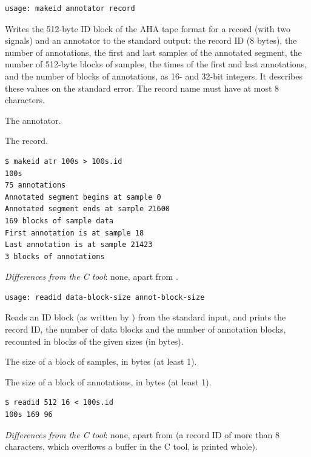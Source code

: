 \begin{lstlisting}[style=signature,language={}]
usage: makeid annotator record
\end{lstlisting}
Writes the 512-byte ID block of the AHA tape format for a record (with two signals) and an
annotator to the standard output: the record ID (8 bytes), the number of annotations, the
first and last samples of the annotated segment, the number of 512-byte blocks of samples,
the times of the first and last annotations, and the number of blocks of annotations, as
16- and 32-bit integers. It describes these values on the standard error. The record name
must have at most 8 characters.
\begin{params}
\item[annotator] The annotator.
\item[record] The record.
\end{params}
\begin{lstlisting}[style=text]
$ makeid atr 100s > 100s.id
100s
75 annotations
Annotated segment begins at sample 0
Annotated segment ends at sample 21600
169 blocks of sample data
First annotation is at sample 18
Last annotation is at sample 21423
3 blocks of annotations
\end{lstlisting}
\textit{Differences from the C tool}: none, apart from .

\begin{lstlisting}[style=signature,language={}]
usage: readid data-block-size annot-block-size
\end{lstlisting}
Reads an ID block (as written by ) from the standard input, and prints the
record ID, the number of data blocks and the number of annotation blocks, recounted in
blocks of the given sizes (in bytes).
\begin{params}
\item[data-block-size] The size of a block of samples, in bytes (at least 1).
\item[annot-block-size] The size of a block of annotations, in bytes (at least 1).
\end{params}
\begin{lstlisting}[style=text]
$ readid 512 16 < 100s.id
100s 169 96
\end{lstlisting}
\textit{Differences from the C tool}: none, apart from  (a record ID of
more than 8 characters, which overflows a buffer in the C tool, is printed whole).

